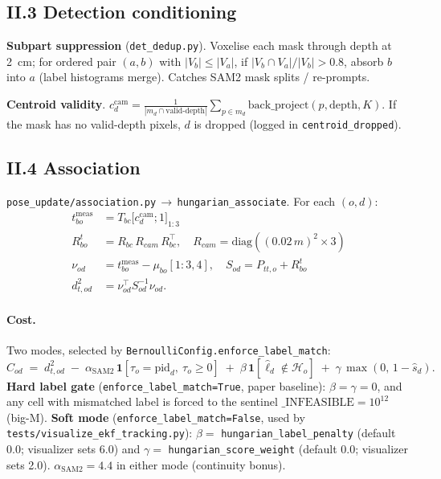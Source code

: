 \documentclass[11pt]{article}
\newcommand{\file}[1]{\texttt{#1}}
\begin{document}
\subsection*{II.3 Detection conditioning}

\textbf{Subpart suppression} (\file{det\_dedup.py}).
Voxelise each mask through depth at 2~cm; for ordered pair $(a,b)$
with $|V_b|\le|V_a|$, if $|V_b\cap V_a|/|V_b|>0.8$, absorb $b$ into $a$
(label histograms merge). Catches SAM2 mask splits / re-prompts.

\textbf{Centroid validity}.
$c_d^{\text{cam}} = \frac{1}{|m_d\cap\text{valid-depth}|}\sum_{p\in m_d}\mathrm{back\_project}(p,\mathrm{depth},K)$.
If the mask has no valid-depth pixels, $d$ is dropped (logged in
\texttt{centroid\_dropped}).

\subsection*{II.4 Association}

\file{pose\_update/association.py}\,$\to$\,\texttt{hungarian\_associate}.
For each $(o,d)$:
\begin{align*}
  t_{bo}^{\text{meas}} &= T_{bc}\bigl[c_d^{\text{cam}}; 1\bigr]_{1:3} \\
  R_{bo}^t &= R_{bc}\,R_{cam}\,R_{bc}^\top, \quad R_{cam} = \mathrm{diag}((0.02\,m)^2{\times}3) \\
  \nu_{od} &= t_{bo}^{\text{meas}} - \mu_{bo}[1{:}3, 4],\quad
  S_{od} = P_{tt,o} + R_{bo}^t \\
  d^2_{t,od} &= \nu_{od}^\top S_{od}^{-1} \nu_{od}.
\end{align*}

\paragraph{Cost.}
Two modes, selected by \texttt{BernoulliConfig.enforce\_label\_match}:
\begin{equation}\label{eq:cost_sam2}
C_{od} \;=\; d^2_{t,od}
  \;-\;\alpha_{\text{SAM2}}\,\bm 1[\tau_o = \mathrm{pid}_d,\ \tau_o\ge 0]
  \;+\;\beta\,\bm 1[\hat\ell_d \notin \mathcal H_o]
  \;+\;\gamma\,\max(0,\,1-\hat s_d).
\end{equation}
\textbf{Hard label gate} (\texttt{enforce\_label\_match=True}, paper
baseline): $\beta = \gamma = 0$, and any cell with mismatched label is
forced to the sentinel $\_\text{INFEASIBLE}=10^{12}$ (big-M).
\textbf{Soft mode} (\texttt{enforce\_label\_match=False}, used by
\file{tests/visualize\_ekf\_tracking.py}): $\beta=$
\texttt{hungarian\_label\_penalty} (default 0.0; visualizer sets 6.0)
and $\gamma=$ \texttt{hungarian\_score\_weight} (default 0.0; visualizer
sets 2.0). $\alpha_{\text{SAM2}}=4.4$ in either mode (continuity bonus).
\end{document}
